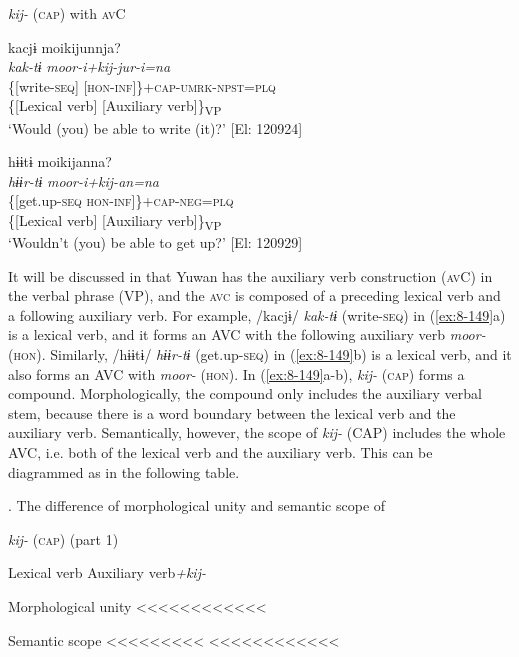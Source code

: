 \ea\label{ex:8-149}
  \textit{kij-} (\textsc{cap}) with \textsc{av}C

\ea
{\TM}
\gllll  kacjɨ  moikijunnja?\\
\textit{kak-tɨ}  \textit{moor-i+kij-jur-i=na}\\
\{[write-\textsc{seq}]  [\textsc{hon}-\textsc{inf}]\}+\textsc{cap}-\textsc{umrk}-\textsc{npst}=\textsc{plq}\\
      \{[Lexical verb]  [Auxiliary verb]\}\textsubscript{VP}\\
\glt ‘Would (you) be able to write (it)?’ [El: 120924]

\ex
{\TM}
\gllll  hɨɨtɨ  moikijanna?\\
\textit{hɨɨr-tɨ}  \textit{moor-i+kij-an=na}\\
\{[get.up-\textsc{seq}  \textsc{hon}-\textsc{inf}]\}+\textsc{cap}-\textsc{neg}=\textsc{plq}\\
      \{[Lexical verb]  [Auxiliary verb]\}\textsubscript{VP}\\
\glt ‘Wouldn’t (you) be able to get up?’ [El: 120929]
\z
\z

It will be discussed in  that Yuwan has the auxiliary verb construction (\textsc{av}C) in the verbal phrase (VP), and the \textsc{avc} is composed of a preceding lexical verb and a following auxiliary verb. For example, /kacjɨ/ \textit{kak-tɨ} (write-\textsc{seq}) in (\ref{ex:8-149}a) is a lexical verb, and it forms an AVC with the following auxiliary verb \textit{moor-} (\textsc{hon}). Similarly, /hɨɨtɨ/ \textit{hɨɨr-tɨ} (get.up-\textsc{seq}) in (\ref{ex:8-149}b) is a lexical verb, and it also forms an AVC with \textit{moor-} (\textsc{hon}). In (\ref{ex:8-149}a-b), \textit{kij-} (\textsc{cap}) forms a compound. Morphologically, the compound only includes the auxiliary verbal stem, because there is a word boundary between the lexical verb and the auxiliary verb. Semantically, however, the scope of \textit{kij-} (CAP) includes the whole AVC, i.e. both of the lexical verb and the auxiliary verb. This can be diagrammed as in the following table.

\begin{table}
\caption{\label{tab:key:89}. The difference of morphological unity and semantic scope of} \textmd{\textit{kij-}}\textmd{ (\textsc{cap}) (part 1)}

  Lexical verb  Auxiliary verb\textit{+kij-}

Morphological unity    <<<<<<<<<<<<

Semantic scope  <<<<<<<<<  <<<<<<<<<<<<
\end{table}

